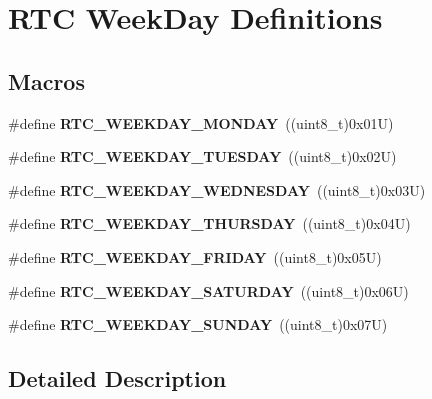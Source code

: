 \hypertarget{group___r_t_c___week_day___definitions}{}\section{R\+TC Week\+Day Definitions}
\label{group___r_t_c___week_day___definitions}
\subsection*{Macros}
\begin{DoxyCompactItemize}
\item 
\mbox{\label{group___r_t_c___week_day___definitions_ga9d74c5e20a481db4f4da69f083b768bf}} 
\#define {\bfseries R\+T\+C\+\_\+\+W\+E\+E\+K\+D\+A\+Y\+\_\+\+M\+O\+N\+D\+AY}~((uint8\+\_\+t)0x01\+U)
\item 
\mbox{\label{group___r_t_c___week_day___definitions_gaf6b6e124a2e74317448abbfb1943e8cc}} 
\#define {\bfseries R\+T\+C\+\_\+\+W\+E\+E\+K\+D\+A\+Y\+\_\+\+T\+U\+E\+S\+D\+AY}~((uint8\+\_\+t)0x02\+U)
\item 
\mbox{\label{group___r_t_c___week_day___definitions_ga0e8a7c338ffda7c9dd47003762d7054c}} 
\#define {\bfseries R\+T\+C\+\_\+\+W\+E\+E\+K\+D\+A\+Y\+\_\+\+W\+E\+D\+N\+E\+S\+D\+AY}~((uint8\+\_\+t)0x03\+U)
\item 
\mbox{\label{group___r_t_c___week_day___definitions_gab166c84a54ace04f6849a8d0e1764107}} 
\#define {\bfseries R\+T\+C\+\_\+\+W\+E\+E\+K\+D\+A\+Y\+\_\+\+T\+H\+U\+R\+S\+D\+AY}~((uint8\+\_\+t)0x04\+U)
\item 
\mbox{\label{group___r_t_c___week_day___definitions_ga3755707d628f4664c30d02fd2a2f0182}} 
\#define {\bfseries R\+T\+C\+\_\+\+W\+E\+E\+K\+D\+A\+Y\+\_\+\+F\+R\+I\+D\+AY}~((uint8\+\_\+t)0x05\+U)
\item 
\mbox{\label{group___r_t_c___week_day___definitions_ga3acccb86a8429fea22f2ac46470b5e55}} 
\#define {\bfseries R\+T\+C\+\_\+\+W\+E\+E\+K\+D\+A\+Y\+\_\+\+S\+A\+T\+U\+R\+D\+AY}~((uint8\+\_\+t)0x06\+U)
\item 
\mbox{\label{group___r_t_c___week_day___definitions_gadab2da4b8aa50c86d68781b379b75783}} 
\#define {\bfseries R\+T\+C\+\_\+\+W\+E\+E\+K\+D\+A\+Y\+\_\+\+S\+U\+N\+D\+AY}~((uint8\+\_\+t)0x07\+U)
\end{DoxyCompactItemize}


\subsection{Detailed Description}
